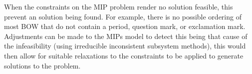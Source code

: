 \documentclass[11pt]{article}
\theoremstyle{plain}
\theoremstyle{definition}
\begin{document}
When the constraints on the MIP problem render no solution feasible, this prevent an solution being found. For example, there is no possible ordering of most BOW that do not contain a period, question mark, or exclamation mark. Adjustments can be made to the MIPs model to detect this being that cause of the infeasibility (using irreducible inconsistent subsystem methods), this would then allow for suitable relaxations to the constraints to be applied to generate solutions to the problem.



\begin{comment}
We first formulate the problem into a Markov graph of states (each correspond to potential subsequences of two words), with edges weighted according to the log of the trigram possibility of the transitions between them 

The probability of any sequence of words can be found using a trigram language model. We can express all possible orderings as a graph between Markov states of the last two words, connected to allowable following words by edged weighted by the negative log of the trigram probability. 
 with edges weighted with the logThis language model can be used to 


The problem for ordering is assign an map between 

The problem can be expressed in terms of a Markov  chain
In this section a demonstration of the feasibly of solving for the correct word order, given the output of the previous step is shown. This is a stochastic language modelling problem -- to determine the most likely sequence of words, given the constraints that the words are exactly those given by the BOW output from the previous step. The method presented here is simply to show its feasibility; the development of efficient technique for use in the ordering problem is left for future work.\pdfcomment{LW: I think this sentence/paragraph can be cut down a lot. RT: I agree, If this is a standard approach (used in ASR?) is there a need to describe the background of the beam seach using tri-gram models. YOu should just state what you implemented (with reference of where the beam search using trigrams is used), provide the parameter details in Section 4 and perhaps move the computational analysis (of all compoenents) into a separate section.}


\end{comment}
\end{document}
